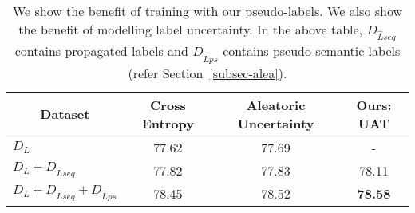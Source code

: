 \begin{table}[t]
    \centering
    \caption{ We show the benefit of training with our pseudo-labels. We also show the benefit of modelling label uncertainty. In the above table,  $D_{\hat{L}seq}$ contains propagated labels and $D_{\hat{L}ps}$ contains pseudo-semantic labels (refer Section~\ref{subsec-alea}).
    }\label{tab_main_ablation}
    \begin{tabular}{llccc}
\toprule
\multicolumn{2}{c}{Dataset}& Cross Entropy & Aleatoric Uncertainty\cite{gal_main} & Ours: UAT \\
\midrule
\multicolumn{2}{l}{$D_L$} & 77.62 & 77.69 & - \\
\multicolumn{2}{l}{$D_L + D_{\hat{L}seq}$ }& 77.82 & 77.83 & 78.11 \\
\midrule
\multicolumn{2}{c}{$D_L + D_{\hat{L}seq} + D_{\hat{L}ps}$} & 78.45  & 78.52 & \textbf{78.58} \\
\bottomrule
    \end{tabular}
\end{table}